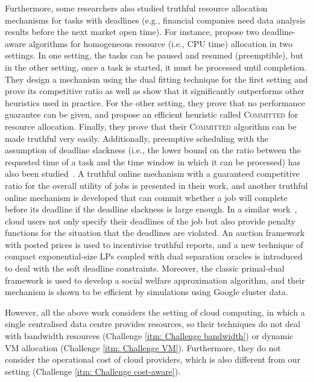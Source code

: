 \documentclass[11pt]{phdthesis}
\begin{document}
Furthermore, some researchers also studied truthful resource allocation mechanisms for tasks with deadlines (e.g., financial companies need data analysis results before the next market open time). For instance, \citet{lucier2013efficient} propose two deadline-aware algorithms for homogeneous resource (i.e., CPU time) allocation in two settings. In one setting, the tasks can be paused and resumed (preemptible), but in the other setting, once a task is started, it must be processed until completion. They design a mechanism using the dual fitting technique for the first setting and prove its competitive ratio as well as show that it significantly outperforms other heuristics used in practice. For the other setting, they prove that no performance guarantee can be given, and propose an efficient heuristic called \textsc{Committed} for resource allocation. Finally, they prove that their \textsc{Committed} algorithm can be made truthful very easily.
Additionally, preemptive scheduling with the assumption of deadline slackness (i.e., the lower bound on the ratio between the requested time of a task and the time window in which it can be processed) has also been studied~\citep{azar2015truthful}. A truthful online mechanism with a guaranteed competitive ratio for the overall utility of jobs is presented in their work, and another truthful online mechanism is developed that can commit whether a job will complete before its deadline if the deadline slackness is large enough. In a similar work~\citep{zhou2017efficient}, cloud users not only specify their deadlines of the job but also provide penalty functions for the situation that the deadlines are violated. An auction framework with posted prices is used to incentivise truthful reports, and a new technique of compact exponential-size LPs coupled with dual separation oracles is introduced to deal with the soft deadline constraints. Moreover, the classic primal-dual framework is used to develop a social welfare approximation algorithm, and their mechanism is shown to be efficient by simulations using Google cluster data. 

However, all the above work considers the setting of cloud computing, in which a single centralised data centre provides resources, so their techniques do not deal with bandwidth resources (Challenge \ref{itm: Challenge bandwidth}) or dynamic VM allocation (Challenge \ref{itm: Challenge VM}). Furthermore, they do not consider the operational cost of cloud providers, which is also different from our setting (Challenge \ref{itm: Challenge cost-aware}). 
\end{document}
